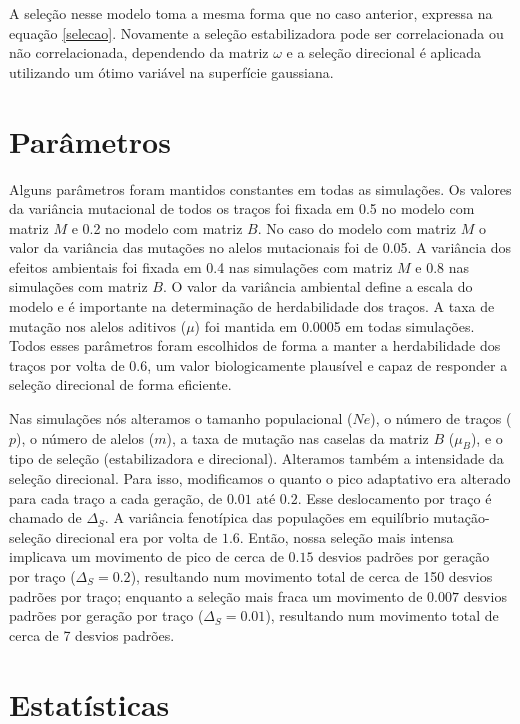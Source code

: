A seleção nesse modelo toma a mesma forma que no caso anterior, expressa
na equação \ref{selecao}.
Novamente a seleção estabilizadora pode ser correlacionada ou não
correlacionada, dependendo da matriz $\omega$ e a seleção direcional é
aplicada utilizando um ótimo variável na superfície gaussiana.

\section{Parâmetros}

Alguns parâmetros foram mantidos constantes em todas as simulações.
Os valores da variância mutacional de todos os traços foi fixada em 0.5
no modelo com matriz $M$ e 0.2 no modelo com matriz $B$.
No caso do modelo com matriz $M$ o valor da variância das mutações no
alelos mutacionais foi de 0.05.
A variância dos efeitos ambientais foi fixada em 0.4 nas simulações com
matriz $M$ e 0.8 nas simulações com matriz $B$.
O valor da variância ambiental define a escala do modelo e é importante
na determinação de herdabilidade dos traços.
A taxa de mutação nos alelos aditivos ($\mu$) foi mantida em 0.0005 em
todas simulações.
Todos esses parâmetros foram escolhidos de forma a manter a
herdabilidade dos traços por volta de 0.6, um valor biologicamente
plausível e capaz de responder a seleção direcional de forma eficiente.

Nas simulações nós alteramos o tamanho populacional ($Ne$), o número de
traços ($p$), o número de alelos ($m$), a taxa de mutação nas caselas da
matriz $B$ ($\mu_B$), e o tipo de seleção (estabilizadora e direcional).
Alteramos também a intensidade da seleção direcional.
Para isso, modificamos o quanto o pico adaptativo era alterado para cada
traço a cada geração, de $0.01$ até $0.2$.
Esse deslocamento por traço é chamado de $\Delta_S$.
A variância fenotípica das populações em equilíbrio mutação-seleção
direcional era por volta de $1.6$.
Então, nossa seleção mais intensa implicava um movimento de pico de
cerca de $0.15$ desvios padrões por geração por traço ($\Delta_S=0.2$),
resultando num movimento total de cerca de 150 desvios padrões por
traço; enquanto a seleção mais fraca um movimento de $0.007$ desvios
padrões por geração por traço ($\Delta_S=0.01$), resultando num
movimento total de cerca de 7 desvios padrões.

\section{Estatísticas}

